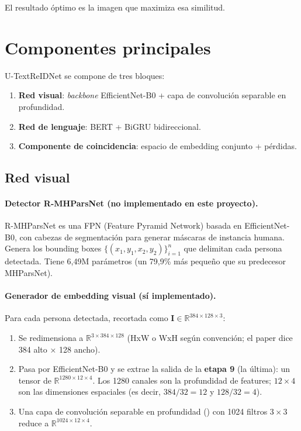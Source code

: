 \noindent El resultado óptimo es la imagen que maximiza esa
similitud.

\section{Componentes principales}

U-TextReIDNet se compone de tres bloques:

\begin{enumerate}
  \item \textbf{Red visual}: \emph{backbone} EfficientNet-B0 +
        capa de convolución separable en profundidad.
  \item \textbf{Red de lenguaje}: BERT + BiGRU bidireccional.
  \item \textbf{Componente de coincidencia}: espacio de embedding
        conjunto + pérdidas.
\end{enumerate}

\subsection{Red visual}

\paragraph{Detector R-MHParsNet (no implementado en este proyecto).}

R-MHParsNet es una FPN (Feature Pyramid Network) basada en
EfficientNet-B0, con cabezas de segmentación para generar máscaras
de instancia humana. Genera los bounding boxes
$\{(x_1,y_1,x_2,y_2)\}_{i=1}^{n}$ que delimitan cada persona
detectada. Tiene 6,49M parámetros (un 79,9\% más pequeño que su
predecesor MHParsNet).

\paragraph{Generador de embedding visual (sí implementado).}

Para cada persona detectada, recortada como
$\mathbf{I} \in \mathbb{R}^{384 \times 128 \times 3}$:

\begin{enumerate}
  \item Se redimensiona a $\mathbb{R}^{3 \times 384 \times 128}$
        (HxW o WxH según convención; el paper dice 384 alto × 128
        ancho).
  \item Pasa por EfficientNet-B0 y se extrae la salida de la
        \textbf{etapa 9} (la última): un tensor de
        $\mathbb{R}^{1280 \times 12 \times 4}$. Los 1280 canales
        son la profundidad de features; $12 \times 4$ son las
        dimensiones espaciales (es decir, $384 / 32 = 12$ y
        $128 / 32 = 4$).
  \item Una capa de convolución separable en profundidad
        (\dsc{}) con 1024 filtros $3 \times 3$ reduce a
        $\mathbb{R}^{1024 \times 12 \times 4}$.
\end{enumerate}

